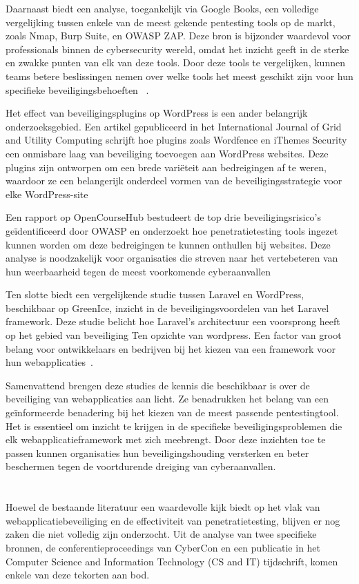 Daarnaast biedt een analyse, toegankelijk via Google Books, een volledige vergelijking tussen enkele van de meest gekende pentesting tools op de markt, 
zoals Nmap, Burp Suite, en OWASP ZAP. Deze bron is bijzonder waardevol voor professionals binnen de cybersecurity wereld, omdat het inzicht geeft in de sterke en zwakke 
punten van elk van deze tools. Door deze tools te vergelijken, kunnen teams betere beslissingen nemen over welke tools het meest geschikt zijn 
voor hun specifieke beveiligingsbehoeften ~\autocite{Velu2022}.

Het effect van beveiligingsplugins op WordPress is een ander belangrijk onderzoeksgebied. Een artikel gepubliceerd in het International Journal of Grid and Utility Computing 
schrijft hoe plugins zoals Wordfence en iThemes Security een onmisbare laag van beveiliging toevoegen aan WordPress websites. Deze plugins zijn ontworpen om een brede variëteit 
aan bedreigingen af te weren, waardoor ze een belangerijk onderdeel vormen van de beveiligingsstrategie voor elke WordPress-site~\autocite{Casola2020}

Een rapport op OpenCourseHub bestudeert de top drie beveiligingsrisico's geïdentificeerd door OWASP en onderzoekt hoe penetratietesting tools ingezet kunnen 
worden om deze bedreigingen te kunnen onthullen bij websites. Deze analyse is noodzakelijk voor organisaties die streven naar het vertebeteren van hun weerbaarheid tegen 
de meest voorkomende cyberaanvallen ~\autocite{Sharma2023}

Ten slotte biedt een vergelijkende studie tussen Laravel en WordPress, beschikbaar op GreenIce, inzicht in de beveiligingsvoordelen van het Laravel framework. 
Deze studie belicht hoe Laravel's architectuur een voorsprong heeft op het gebied van beveiliging Ten opzichte van wordpress. Een factor van groot belang voor 
ontwikkelaars en bedrijven bij het kiezen van een framework voor hun webapplicaties~\autocite{Lebedeva2023}.

Samenvattend brengen deze studies de kennis die beschikbaar is over de beveiliging van webapplicaties aan licht. Ze benadrukken het belang van een geïnformeerde benadering bij 
het kiezen van de meest passende pentestingtool. Het is essentieel om inzicht te krijgen in de specifieke beveiligingsproblemen die elk webapplicatieframework met zich meebrengt. Door deze inzichten 
toe te passen kunnen organisaties hun beveiligingshouding versterken en beter beschermen tegen de voortdurende dreiging van cyberaanvallen.

\section{}
Hoewel de bestaande literatuur een waardevolle kijk biedt op het vlak van webapplicatiebeveiliging en de effectiviteit van penetratietesting, blijven er nog 
zaken die niet volledig zijn onderzocht. Uit de analyse van twee specifieke bronnen, de conferentieproceedings van CyberCon en een publicatie in het 
Computer Science and Information Technology (CS and IT) tijdschrift, komen enkele van deze tekorten aan bod.

